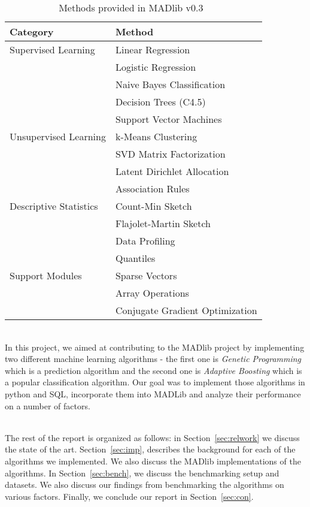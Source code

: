 \begin{table}[!ht]
\centering
\begin{tabular}{|l|l|}
\hline
Category & Method\\
\hline
Supervised Learning & Linear Regression\\
& Logistic Regression\\
& Naive Bayes Classification\\
& Decision Trees (C4.5)\\
& Support Vector Machines\\
\hline
Unsupervised Learning & k-Means Clustering\\
& SVD Matrix Factorization\\
& Latent Dirichlet Allocation\\
& Association Rules\\
\hline
Descriptive Statistics & Count-Min Sketch\\
& Flajolet-Martin Sketch\\
& Data Profiling\\
& Quantiles\\
\hline
Support Modules & Sparse Vectors\\
& Array Operations\\
& Conjugate Gradient Optimization\\
\hline
\end{tabular}
\caption{Methods provided in MADlib v0.3~\cite{madlib12}}
\label{tab:mad}
\end{table}

~~\\
In this project, we aimed at contributing to the MADlib project by implementing two different machine learning algorithms - the first one is {\itshape Genetic Programming} which is a prediction algorithm and the second one is {\itshape Adaptive Boosting} which is a popular classification algorithm. Our goal was to implement those algorithms in python and SQL, incorporate them into MADLib and analyze their performance on a number of factors.

~~\\
The rest of the report is organized as follows: in Section~\ref{sec:relwork} we discuss the state of the art. Section~\ref{sec:imp}, describes the background for each of the algorithms we implemented. We also discuss the MADlib implementations of the algorithms. In Section~\ref{sec:bench}, we discuss the benchmarking setup and datasets. We also discuss our findings from benchmarking the algorithms on various factors. Finally, we conclude our report in Section~\ref{sec:con}.
